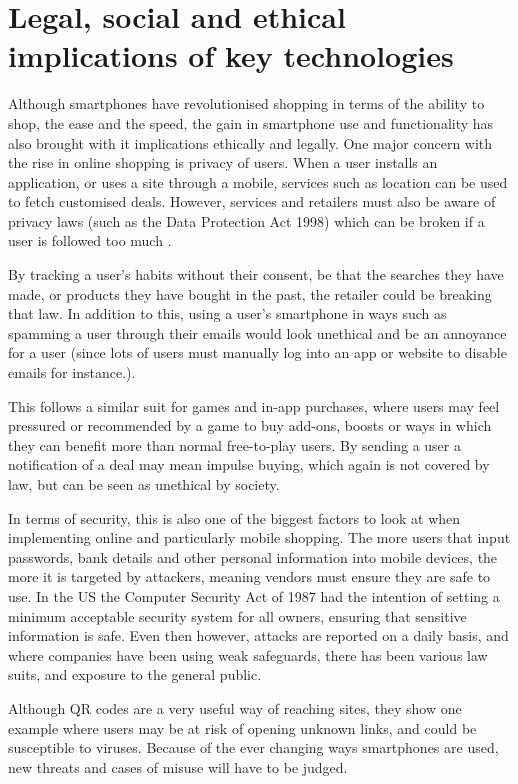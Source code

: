 \section{Legal, social and ethical implications of key technologies}

Although smartphones have revolutionised shopping in terms of the ability to shop, the ease and the speed, the gain in smartphone use and functionality has also brought with it implications ethically and legally. One major concern with the rise in online shopping is privacy of users. When a user installs an application, or uses a site through a mobile, services such as location can be used to fetch customised deals. However, services and retailers must also be aware of privacy laws (such as the Data Protection Act 1998) which can be broken if a user is followed too much \cite{french}.  \par
By tracking a user's habits without their consent, be that the searches they have made, or products they have bought in the past, the retailer could be breaking that law. In addition to this, using a user's smartphone in ways such as spamming a user through their emails would look unethical and be an annoyance for a user (since lots of users must manually log into an app or website to disable emails for instance.). \par
This follows a similar suit for games and in-app purchases, where users may feel pressured or recommended by a game to buy add-ons, boosts or ways in which they can benefit more than normal free-to-play users. By sending a user a notification of a deal may mean impulse buying, which again is not covered by law, but can be seen as unethical by society. \par
In terms of security, this is also one of the biggest factors to look at when implementing online and particularly mobile shopping. The more users that input passwords, bank details and other personal information into mobile devices, the more it is targeted by attackers, meaning vendors must ensure they are safe to use. In the US the Computer Security Act of 1987 had the intention of setting a minimum acceptable security system for all owners, ensuring that sensitive information is safe. Even then however, attacks are reported on a daily basis, and where companies have been using weak safeguards, there has been various law suits, and exposure to the general public. \par
Although QR codes are a very useful way of reaching sites, they show one example where users may be at risk of opening unknown links, and could be susceptible to viruses. Because of the ever changing ways smartphones are used, new threats and cases of misuse will have to be judged. 

